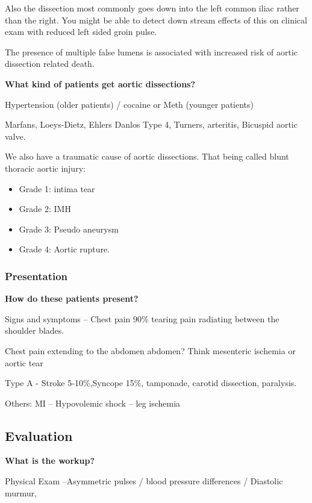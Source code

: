 \documentclass[
]{book}
\begin{document}
Also the dissection most commonly goes down into the left common iliac
rather than the right. You might be able to detect down stream effects
of this on clinical exam with reduced left sided groin pulse.

The presence of multiple false lumens is associated with increased risk
of aortic dissection related death.\citep{sueyoshi2013}

\textbf{What kind of patients get aortic dissections?}

Hypertension (older patients) / cocaine or Meth (younger patients)

Marfans, Loeys-Dietz, Ehlers Danlos Type 4, Turners, arteritis, Bicuspid
aortic valve.

We also have a traumatic cause of aortic dissections. That being called
blunt thoracic aortic injury:

\begin{itemize}
\item
  Grade 1: intima tear
\item
  Grade 2: IMH
\item
  Grade 3: Pseudo aneurysm
\item
  Grade 4: Aortic rupture.
\end{itemize}

\hypertarget{presentation-12}{%
\subsubsection{Presentation}\label{presentation-12}}

\textbf{How do these patients present?}

Signs and symptoms -- Chest pain 90\% tearing pain radiating between the
shoulder blades.

Chest pain extending to the abdomen abdomen? Think mesenteric ischemia
or aortic tear

Type A - Stroke 5-10\%,Syncope 15\%, tamponade, carotid dissection,
paralysis.

Others: MI -- Hypovolemic shock -- leg ischemia

\hypertarget{evaluation-17}{%
\subsection{Evaluation}\label{evaluation-17}}

\textbf{What is the workup?}

Physical Exam --Asymmetric pulses / blood pressure differences /
Diastolic murmur,
\end{document}
